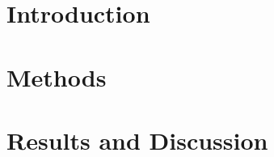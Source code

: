 \documentclass[conference]{IEEEtran}
\begin{document}
\begin{abstract}
\end{abstract}

\begin{IEEEkeywords}
\end{IEEEkeywords}

\section{Introduction}

\section{Methods}

\section{Results and Discussion}

\end{document}
